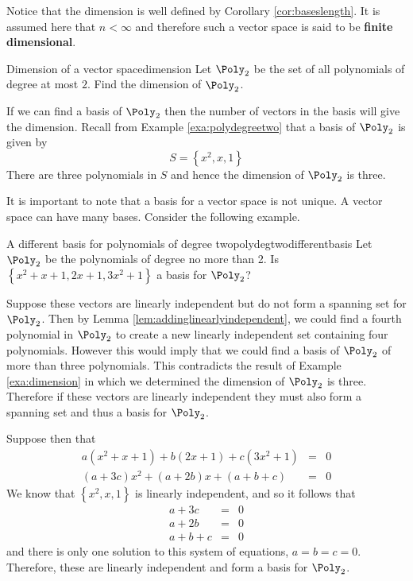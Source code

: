Notice that the dimension is well defined by Corollary \ref{cor:baseslength}. It is assumed here
that $n<\infty $ and therefore such a vector space is said to be \textbf{finite
dimensional}.

\begin{example}{Dimension of a vector space}{dimension}
Let $\Poly_2$ be the set of all polynomials of degree at most $2$. Find the dimension of $\Poly_2$. 
\end{example}

\begin{solution}
If we can find a basis of $\Poly_2$ then the number of vectors in the basis will give the dimension. Recall from Example \ref{exa:polydegreetwo} that a basis of $\Poly_2$ is given by 
\[
S  = \left\{ x^2, x, 1 \right\}
\]
There are three polynomials in $S$ and hence the dimension of $\Poly_2$ is three. 
\end{solution}

It is important to note that a basis for a vector space is not unique. A vector space can have many bases. Consider the following example.

\begin{example}{A different basis for polynomials of degree two}{polydegtwodifferentbasis}
Let $\Poly_2$ be the polynomials of degree no more than 2. Is $\left\{
x^{2}+x+1,2x+1,3x^{2}+1\right\} $ a basis for $\Poly_2$?
\end{example}

\begin{solution}
Suppose these vectors are linearly independent but do not form a spanning set for $\Poly_2$. Then by Lemma \ref{lem:addinglinearlyindependent}, we could find a fourth polynomial in $\Poly_2$ to create a new linearly independent 
set containing four polynomials. However this would imply that we could find a basis of $\Poly_2$ of more than three polynomials. This contradicts the result of Example \ref{exa:dimension} in which we determined the dimension of $\Poly_2$ is three.  Therefore if these vectors are linearly independent they must also form a spanning set and thus a basis for $\Poly_2$. 

Suppose then that 
\begin{eqnarray*}
a\left( x^{2}+x+1\right) +b\left( 2x+1\right) +c\left( 3x^{2}+1\right) &=& 0\\
\left( a+3c\right) x^{2}+\left( a+2b\right) x+\left( a+b+c\right) &=& 0 
\end{eqnarray*}
We know that $\left\{ x^2, x, 1 \right\}$ is linearly independent, and so it follows that  
\begin{eqnarray*}
a+3c &=& 0 \\
a+2b &=& 0 \\
a+b+c &=& 0
\end{eqnarray*}
and there is only one solution to this system of equations, $a=b=c=0$.
Therefore, these are linearly independent and form a basis for $\Poly_2$.
\end{solution}

